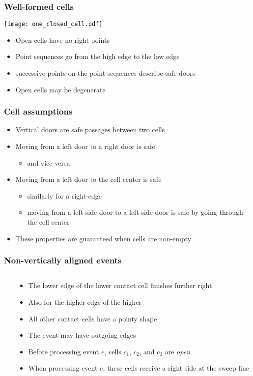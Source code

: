 \documentclass[compress]{beamer}
\begin{document}
\begin{frame}
\frametitle{Well-formed cells}
\texttt{[image: one\_closed\_cell.pdf]}

\begin{itemize}
\item Open cells have no right points
\item Point sequences go from the high edge to the low edge
\item successive points on the point sequences describe safe doors
\item Open cells may be degenerate
\end{itemize}
\end{frame}
\begin{frame}
\frametitle{Cell assumptions}
\begin{itemize}
\item Vertical doors are safe passages between two cells
\item Moving from a left door  to a right door is safe
\begin{itemize}
\item and vice-versa
\end{itemize}
\item Moving from a left door to the cell center is safe
\begin{itemize}
\item similarly for a right-edge
\item moving from a left-side door to a left-side door is
safe by going through the cell center
\end{itemize}
\item These properties are guaranteed when cells are non-empty
\end{itemize}
\end{frame}
\begin{frame}
\frametitle{Non-vertically aligned events}
\begin{columns}
\begin{column}{0.3\textwidth}
\end{column}
\begin{column}{0.7\textwidth}
\begin{itemize}
\item The lower edge of the lower contact cell finishes further right
\item Also for the higher edge of the higher
\item All other contact cells have a pointy shape
\item The event may have outgoing edges
\item Before processing event \(e\), cells \(c_1\), \(c_2\), and \(c_3\) are
{\em open}
\item When processing event \(e\), these cells receive a right side at
the sweep line
\end{itemize}
\end{column}
\end{columns}
\end{frame}
\end{document}
